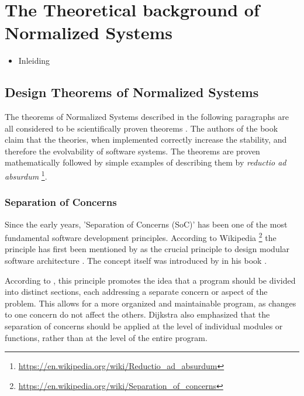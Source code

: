 \section{The Theoretical background of Normalized Systems} \label{ns_theory}
\begin{itemize}
    \item Inleiding
\end{itemize}


\subsection{Design Theorems of Normalized Systems} \label{subsec:ns_desing_theorems}

The theorems of Normalized Systems described in the following paragraphs are all
considered to be scientifically proven theorems \parencite{mannaert_normalized_2016}. The
authors of the book claim that the theories, when implemented correctly increase
the stability, and therefore the evolvability of software systems. The theorems are proven
mathematically followed by simple examples of describing them by \textit{reductio ad absurdum} 
\footnote{\url{https://en.wikipedia.org/wiki/Reductio_ad_absurdum}}.

\subsubsection{Separation of Concerns}
Since the early years, 'Separation of Concerns (SoC)' has been one of the most fundamental
software development principles. According to Wikipedia
\footnote{\url{https://en.wikipedia.org/wiki/Separation_of_concerns}} the principle has
first been mentioned by \citeauthor{dijkstra_selected_1982} as the crucial principle to
design modular software architecture \parencite[]{dijkstra_selected_1982}. The concept
itself was introduced by \citeauthor{broy_criteria_1972} in his book
.

According to \citeauthor{dijkstra_selected_1982}, this principle promotes the idea that a
program should be divided into distinct sections, each addressing a separate concern or
aspect of the problem. This allows for a more organized and maintainable program, as
changes to one concern do not affect the others. Dijkstra also emphasized that the
separation of concerns should be applied at the level of individual modules or functions,
rather than at the level of the entire program.


